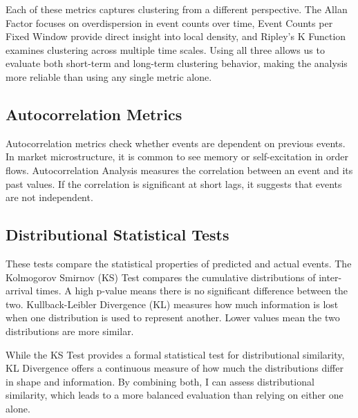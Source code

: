 Each of these metrics captures clustering from a different perspective. The Allan Factor focuses on overdispersion in event counts over time, Event Counts per Fixed Window provide direct insight into local density, and Ripley's K Function examines clustering across multiple time scales. Using all three allows us to evaluate both short-term and long-term clustering behavior, making the analysis more reliable than using any single metric alone.

\subsection{Autocorrelation Metrics}
Autocorrelation metrics check whether events are dependent on previous events. In market microstructure, it is common to see memory or self-excitation in order flows. Autocorrelation Analysis measures the correlation between an event and its past values. If the correlation is significant at short lags, it suggests that events are not independent.

\subsection{Distributional Statistical Tests}
These tests compare the statistical properties of predicted and actual events. The Kolmogorov Smirnov (KS) Test compares the cumulative distributions of inter-arrival times. A high p-value means there is no significant difference between the two. Kullback-Leibler Divergence (KL) measures how much information is lost when one distribution is used to represent another. Lower values mean the two distributions are more similar.

While the KS Test provides a formal statistical test for distributional similarity, KL Divergence offers a continuous measure of how much the distributions differ in shape and information. By combining both, I can assess distributional similarity, which leads to a more balanced evaluation than relying on either one alone.


